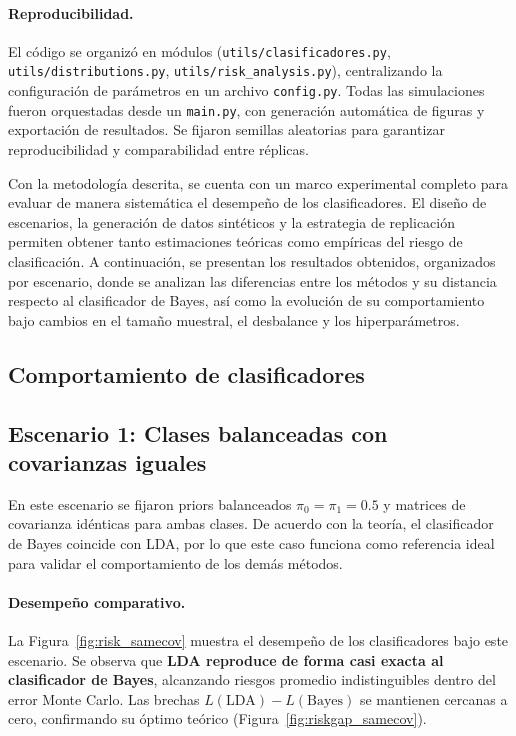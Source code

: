 \documentclass[10pt]{article}
\begin{document}
\paragraph{Reproducibilidad.}
El código se organizó en módulos (\texttt{utils/clasificadores.py}, \texttt{utils/distributions.py}, \texttt{utils/risk\_analysis.py}), centralizando la configuración de parámetros en un archivo \texttt{config.py}. Todas las simulaciones fueron orquestadas desde un \texttt{main.py}, con generación automática de figuras y exportación de resultados. Se fijaron semillas aleatorias para garantizar reproducibilidad y comparabilidad entre réplicas.


\medskip


Con la metodología descrita, se cuenta con un marco experimental completo para evaluar de manera sistemática el desempeño de los clasificadores. El diseño de escenarios, la generación de datos sintéticos y la estrategia de replicación permiten obtener tanto estimaciones teóricas como empíricas del riesgo de clasificación. A continuación, se presentan los resultados obtenidos, organizados por escenario, donde se analizan las diferencias entre los métodos y su distancia respecto al clasificador de Bayes, así como la evolución de su comportamiento bajo cambios en el tamaño muestral, el desbalance y los hiperparámetros.


\subsection*{Comportamiento de clasificadores}

\subsection*{Escenario 1: Clases balanceadas con covarianzas iguales}

En este escenario se fijaron priors balanceados $\pi_0=\pi_1=0.5$ y matrices de covarianza idénticas para ambas clases. 
De acuerdo con la teoría, el clasificador de Bayes coincide con LDA, por lo que este caso funciona como referencia ideal 
para validar el comportamiento de los demás métodos.

\paragraph{Desempeño comparativo.}
La Figura~\ref{fig:risk_samecov} muestra el desempeño de los clasificadores bajo este escenario. 
Se observa que \textbf{LDA reproduce de forma casi exacta al clasificador de Bayes}, alcanzando riesgos promedio indistinguibles dentro del error Monte Carlo. 
Las brechas $L(\text{LDA})-L(\text{Bayes})$ se mantienen cercanas a cero, confirmando su óptimo teórico (Figura~\ref{fig:riskgap_samecov}).  
\end{document}
